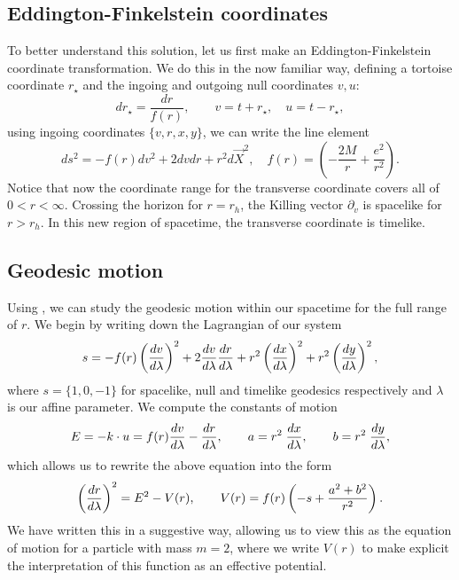 \subsection{Eddington-Finkelstein coordinates}

To better understand this solution, let us first make an Eddington-Finkelstein coordinate transformation. We do this in the now familiar way, defining a tortoise coordinate $r_\star$ and the ingoing and outgoing null coordinates $v, u$:
\begin{equation*}
	dr_\star = \frac{dr}{f(r)}, \qquad v = t + r_\star, \quad u = t - r_\star,
\end{equation*}
using ingoing coordinates $\{v,r,x,y\}$, we can write the line element
\begin{equation}
\label{eq:planaremef}
	ds^2 = - f(r) dv^2 + 2dv dr + r^2 d\vec{X}^2, \quad f(r) = \left( - \frac{2M}{r} + \frac{e^2}{r^2} \right).
\end{equation}
Notice that now the coordinate range for the transverse coordinate covers all of $0 < r < \infty$. Crossing the horizon for $r = r_h$, the Killing vector $\partial_v$ is spacelike for $r > r_h$. In this new region of spacetime, the transverse coordinate is timelike. 

\subsection{Geodesic motion}
\label{sec:emgeodesics}
Using , we can study the geodesic motion within our spacetime for the full range of $r$. We begin by writing down the Lagrangian of our system
\begin{equation}
    s = - f(r) \left(\frac{d v}{d \lambda} \right)^2 + 2 \frac{d v}{d \lambda} \frac{d r}{d \lambda} + r^2 \left(\frac{d x}{d \lambda} \right)^2 +r^2  \left(\frac{d y}{d \lambda} \right)^2 ,
\end{equation}
where $s = \{1, 0, -1\}$ for spacelike, null and timelike geodesics respectively and $\lambda$ is our affine parameter. We compute the constants of motion
\begin{equation*}
	E = - k \cdot u = f(r) \frac{d v}{d \lambda} - \frac{d r}{d \lambda}, \qquad a = r^2 \; \frac{d x}{d \lambda}, \qquad b = r^2 \;\frac{d y}{d \lambda},
\end{equation*}
which allows us to rewrite the above equation into the form
\begin{equation*}
	\left(\frac{d r}{d \lambda} \right)^2 = E^2 - V(r), \qquad V(r) = f(r) \left(-s + \frac{a^2 + b^2}{r^2} \right).
\end{equation*}
We have written this in a suggestive way, allowing us to view this as the equation of motion for a particle with mass $m=2$, where we write $V(r)$ to make explicit the interpretation of this function as an effective potential.


